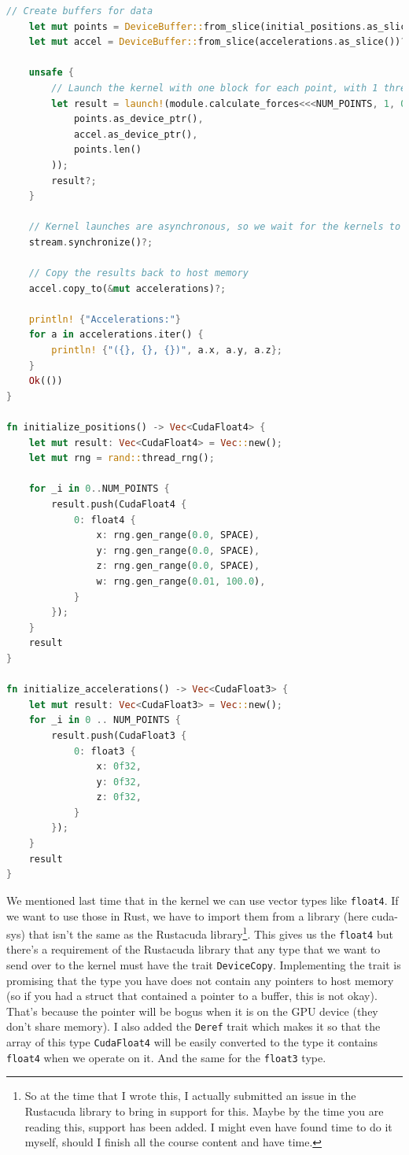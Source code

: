 \begin{lstlisting}[language=Rust]
    // Create buffers for data
    let mut points = DeviceBuffer::from_slice(initial_positions.as_slice())?;
    let mut accel = DeviceBuffer::from_slice(accelerations.as_slice())?;

    unsafe {
        // Launch the kernel with one block for each point, with 1 thread each, no dynamic shared memory on `stream`.
        let result = launch!(module.calculate_forces<<<NUM_POINTS, 1, 0, stream>>>(
            points.as_device_ptr(),
            accel.as_device_ptr(),
            points.len()
        ));
        result?;
    }

    // Kernel launches are asynchronous, so we wait for the kernels to finish executing.
    stream.synchronize()?;

    // Copy the results back to host memory
    accel.copy_to(&mut accelerations)?;

    println! {"Accelerations:"}
    for a in accelerations.iter() {
        println! {"({}, {}, {})", a.x, a.y, a.z};
    }
    Ok(())
}

fn initialize_positions() -> Vec<CudaFloat4> {
    let mut result: Vec<CudaFloat4> = Vec::new();
    let mut rng = rand::thread_rng();

    for _i in 0..NUM_POINTS {
        result.push(CudaFloat4 {
            0: float4 {
                x: rng.gen_range(0.0, SPACE),
                y: rng.gen_range(0.0, SPACE),
                z: rng.gen_range(0.0, SPACE),
                w: rng.gen_range(0.01, 100.0),
            }
        });
    }
    result
}

fn initialize_accelerations() -> Vec<CudaFloat3> {
    let mut result: Vec<CudaFloat3> = Vec::new();
    for _i in 0 .. NUM_POINTS {
        result.push(CudaFloat3 {
            0: float3 {
                x: 0f32,
                y: 0f32,
                z: 0f32,
            }
        });
    }
    result
}
\end{lstlisting}

We mentioned last time that in the kernel we can use vector types like \texttt{float4}. If we want to use those in Rust, we have to import them from a library (here cuda-sys) that isn't the same as the Rustacuda library\footnote{So at the time that I wrote this, I actually submitted an issue in the Rustacuda library to bring in support for this. Maybe by the time you are reading this, support has been added. I might even have found time to do it myself, should I finish all the course content and have time.}. This gives us the \texttt{float4} but there's a requirement of the Rustacuda library that any type that we want to send over to the kernel must have the trait \texttt{DeviceCopy}. Implementing the trait is promising that the type you have does not contain any pointers to host memory (so if you had a struct that contained a pointer to a buffer, this is not okay). That's because the pointer will be bogus when it is on the GPU device (they don't share memory). I also added the \texttt{Deref} trait which makes it so that the array of this type \texttt{CudaFloat4} will be easily converted to the type it contains \texttt{float4} when we operate on it. And the same for the \texttt{float3} type.


